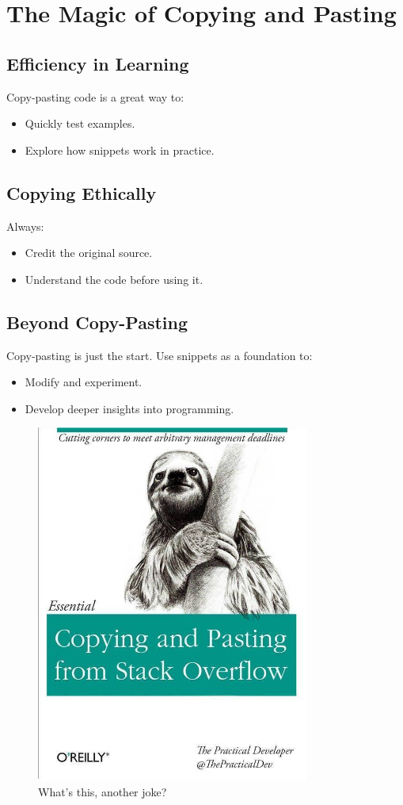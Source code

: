 \section{The Magic of Copying and Pasting}
\subsection{Efficiency in Learning}
Copy-pasting code is a great way to:
\begin{itemize}
\item Quickly test examples.
\item Explore how snippets work in practice.
\end{itemize}

\subsection{Copying Ethically}
Always:
\begin{itemize}
\item Credit the original source.
\item Understand the code before using it.
\end{itemize}

\subsection{Beyond Copy-Pasting}
Copy-pasting is just the start. Use snippets as a foundation to:
\begin{itemize}
\item Modify and experiment.
\item Develop deeper insights into programming.
\end{itemize}

\begin{figure}[h!]
    \centering
    \includegraphics[width=0.8\textwidth]{figures/copypasta.jpg}
    \caption{What's this, another joke?}
    \label{fig:copypasta}
\end{figure}

